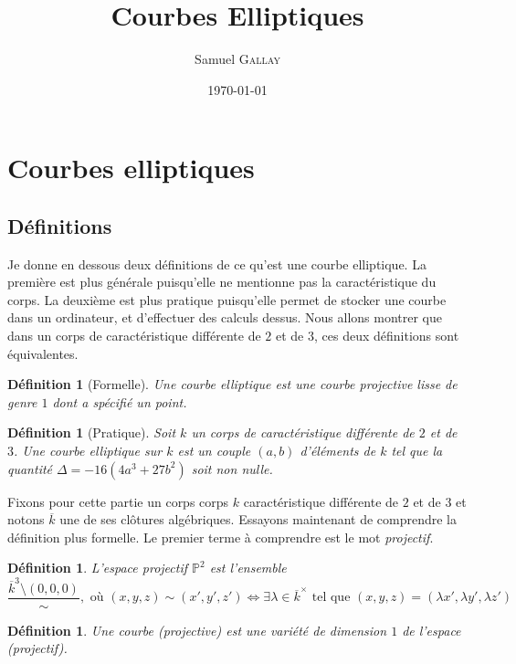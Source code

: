 \documentclass{article}
\title{Courbes Elliptiques}
\author{Samuel \textsc{Gallay}}
\date{\today}
\theoremstyle{plain}%
\newtheorem{deff}[thm]{Définition}
\theoremstyle{definition}%
\begin{document}
\maketitle





\section{Courbes elliptiques}

\subsection{Définitions}

Je donne en dessous deux définitions de ce qu'est une courbe elliptique. La première est plus générale puisqu'elle ne mentionne pas la  caractéristique du corps. La deuxième est plus pratique puisqu'elle permet de stocker une courbe dans un ordinateur, et d'effectuer des calculs dessus. Nous allons montrer que dans un corps de caractéristique différente de $2$ et de $3$, ces deux définitions sont équivalentes.

\begin{deff}[Formelle]
  Une courbe elliptique est une courbe projective lisse de genre $1$ dont a spécifié un point.
\end{deff}

\begin{deff}[Pratique]
  Soit $k$ un corps de caractéristique différente de $2$ et de $3$. Une courbe elliptique sur $k$ est un couple $(a, b)$ d'éléments de $k$ tel que la quantité $\Delta =-16(4a^3+ 27b^2)$ soit non nulle.
\end{deff}

Fixons pour cette partie un corps corps $k$ caractéristique différente de $2$ et de $3$ et notons $\overline{k}$ une de ses clôtures algébriques. Essayons maintenant de comprendre la définition plus formelle. Le premier terme à comprendre est le mot \emph{projectif}.

\begin{deff}
  L'espace projectif $\mathbb{P}^2$ est l'ensemble $$\frac{\overline{k}^3\setminus(0, 0, 0)}{\sim},\text{\ \ où\ \ } (x, y, z) \sim (x', y', z') \iff \exists \lambda \in \overline{k}^\times \text{ tel que } (x, y, z) = (\lambda x', \lambda y', \lambda z')$$
\end{deff}

\begin{deff}
  Une courbe (projective) est une variété de dimension $1$ de l'espace (projectif).
\end{deff}
\end{document}
